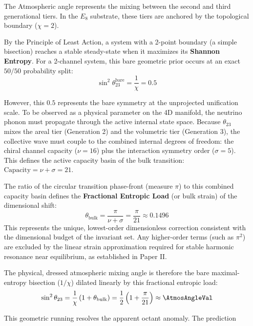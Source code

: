 The Atmospheric angle represents the mixing between the second and third generational tiers. In the $E_8$ substrate, these tiers are anchored by the topological boundary ($\chi=2$). 

By the Principle of Least Action, a system with a 2-point boundary (a simple bisection) reaches a stable steady-state when it maximizes its \textbf{Shannon Entropy}. For a 2-channel system, this bare geometric prior occurs at an exact $50/50$ probability split:
\begin{equation}
    \sin^2\theta_{23}^{\text{bare}} = \frac{1}{\chi} = 0.5
\end{equation}

However, this $0.5$ represents the bare symmetry at the unprojected unification scale. To be observed as a physical parameter on the 4D manifold, the neutrino phonon must propagate through the active internal state space. Because $\theta_{23}$ mixes the areal tier (Generation 2) and the volumetric tier (Generation 3), the collective wave must couple to the combined internal degrees of freedom: the chiral channel capacity ($\nu = 16$) plus the interaction symmetry order ($\sigma = 5$). This defines the active capacity basin of the bulk transition: $\text{Capacity} = \nu + \sigma = 21$.

The ratio of the circular transition phase-front (measure $\pi$) to this combined capacity basin defines the \textbf{Fractional Entropic Load} (or bulk strain) of the dimensional shift:
\begin{equation}
    \theta_{\text{bulk}} = \frac{\pi}{\nu + \sigma} = \frac{\pi}{21} \approx 0.1496
\end{equation}
This represents the unique, lowest-order dimensionless correction consistent with the dimensional budget of the invariant set. Any higher-order terms (such as $\pi^2$) are excluded by the linear strain approximation required for stable harmonic resonance near equilibrium, as established in Paper II.

The physical, dressed atmospheric mixing angle is therefore the bare maximal-entropy bisection ($1/\chi$) dilated linearly by this fractional entropic load:
\begin{equation}
    \sin^2 \theta_{23} = \frac{1}{\chi} \left( 1 + \theta_{\text{bulk}} \right) = \frac{1}{2} \left( 1 + \frac{\pi}{21} \right) \approx \mathbf{\AtmosAngleVal}
\end{equation}

This geometric running resolves the apparent octant anomaly. The prediction \AtmosAngleAccText

